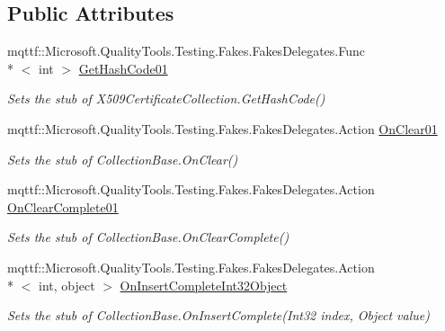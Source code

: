 \subsection*{Public Attributes}
\begin{DoxyCompactItemize}
\item 
mqttf\-::\-Microsoft.\-Quality\-Tools.\-Testing.\-Fakes.\-Fakes\-Delegates.\-Func\\*
$<$ int $>$ \hyperlink{class_system_1_1_security_1_1_cryptography_1_1_x509_certificates_1_1_fakes_1_1_stub_x509_certificate2_collection_acbc185a40a453e173ff8c0897171d803}{Get\-Hash\-Code01}
\begin{DoxyCompactList}\small\item\em Sets the stub of X509\-Certificate\-Collection.\-Get\-Hash\-Code()\end{DoxyCompactList}\item 
mqttf\-::\-Microsoft.\-Quality\-Tools.\-Testing.\-Fakes.\-Fakes\-Delegates.\-Action \hyperlink{class_system_1_1_security_1_1_cryptography_1_1_x509_certificates_1_1_fakes_1_1_stub_x509_certificate2_collection_a59b6422e9c7d3c6ba27f8092aaad2310}{On\-Clear01}
\begin{DoxyCompactList}\small\item\em Sets the stub of Collection\-Base.\-On\-Clear()\end{DoxyCompactList}\item 
mqttf\-::\-Microsoft.\-Quality\-Tools.\-Testing.\-Fakes.\-Fakes\-Delegates.\-Action \hyperlink{class_system_1_1_security_1_1_cryptography_1_1_x509_certificates_1_1_fakes_1_1_stub_x509_certificate2_collection_aad7e0ad1a711dd583b22cfef385f3057}{On\-Clear\-Complete01}
\begin{DoxyCompactList}\small\item\em Sets the stub of Collection\-Base.\-On\-Clear\-Complete()\end{DoxyCompactList}\item 
mqttf\-::\-Microsoft.\-Quality\-Tools.\-Testing.\-Fakes.\-Fakes\-Delegates.\-Action\\*
$<$ int, object $>$ \hyperlink{class_system_1_1_security_1_1_cryptography_1_1_x509_certificates_1_1_fakes_1_1_stub_x509_certificate2_collection_af4585af5b4138e0ceb1d0ecf2aab0c47}{On\-Insert\-Complete\-Int32\-Object}
\begin{DoxyCompactList}\small\item\em Sets the stub of Collection\-Base.\-On\-Insert\-Complete(\-Int32 index, Object value)\end{DoxyCompactList}\item 

\end{DoxyCompactItemize}
